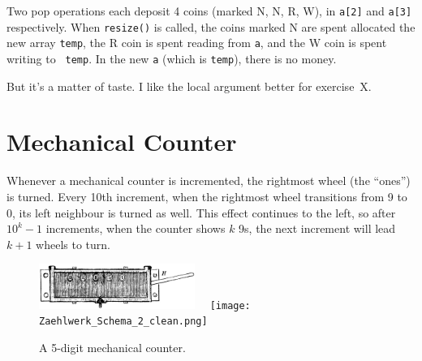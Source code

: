 \documentclass{tufte-handout}
\begin{document}
\begin{marginfigure}
%
\caption{
  Two pop operations each deposit 4 coins (marked N, N, R, W), in
  {\tt a[2]} and {\tt a[3]} respectively.
  When {\tt resize()} is called, the coins
  marked N are spent allocated the new array {\tt temp}, the R coin is
  spent reading from {\tt a}, and the W coin is spent writing to {\tt
    temp}. In the new {\tt a} (which is {\tt temp}), there is no money.
}
\end{marginfigure}

But it's a matter of taste. I like the local argument better for
exercise~X.



\section{Mechanical Counter}

Whenever a mechanical counter is incremented, the rightmost wheel (the
``ones'') is turned. Every 10th increment, when the rightmost wheel
transitions from 9 to 0, its left neighbour is turned as well. This
effect continues to the left, so after $10^k-1$ increments, when the
counter shows $k$ 9s, the next increment will lead $k+1$ wheels to
turn.

\begin{figure}[htb]
\centerline{\includegraphics[width=2in]{Zaehlwerk_Schema_1.jpg}
$\quad$\texttt{[image: Zaehlwerk\_Schema\_2\_clean.png]}}
\caption{A 5-digit mechanical counter.}
\end{figure}
\end{document}
